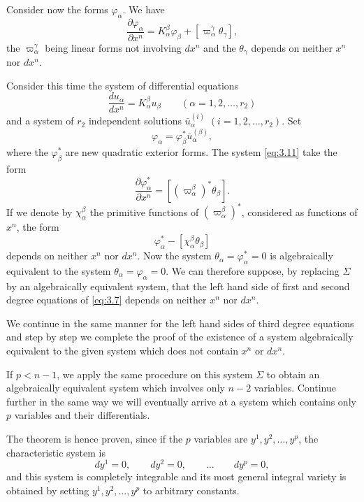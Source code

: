 \documentclass[leqno,11pt]{book}
\numberwithin{equation}{chapter}
\newcommand{\pd}{\partial}
\theoremstyle{shape1}
\theoremstyle{shape0}
\theoremstyle{shape2}
\theoremstyle{definition}
\begin{document}
Consider now the forms $\varphi_{\alpha}$. We have
\begin{equation}
  \label{eq:3.11}
  \frac{\pd \varphi_{\alpha}}{\pd x^{n}}=K^{\beta}_{\alpha}\varphi_{\beta}+[\varpi_{\alpha}^{\gamma}\theta_{\gamma}],
\end{equation}
the $\varpi_{\alpha}^{\gamma}$ being linear forms not involving $dx^{n}$ and the $\theta_{\gamma}$ depends on neither $x^{n}$ nor $dx^{n}$.

Consider this time the system of differential equations
\begin{equation}
  \label{eq:3.12}
  \frac{du_{\alpha}}{dx^{n}}=K_{\alpha}^{\beta}u_{\beta}\qquad(\alpha=1,2,\dots,r_{2})
\end{equation}
and a system of $r_{2}$ independent solutions $\bar u_{\alpha}^{(i)}$ $(i=1,2,\dots,r_{2})$. Set
\[
\varphi_{\alpha}=\varphi_{\beta}^{*}\bar u_{\alpha}^{(\beta)},
\]
where the $\varphi^{*}_{\beta}$ are new quadratic exterior forms. The system \eqref{eq:3.11} take the form
\[
\frac{\pd \varphi_{\alpha}^{*}}{\pd x^{n}}=[(\varpi_{\alpha}^{\beta})^{*}\theta_{\beta}].
\]
If we denote by $\chi_{\alpha}^{\beta}$ the primitive functions of $(\varpi_{\alpha}^{\beta})^{*}$, considered as functions of $x^{n}$,  the form
\[
\varphi_{\alpha}^{*}-[\chi_{\alpha}^{\beta}\theta_{\beta}]
\]
depends on neither $x^{n}$ nor $dx^{n}$. Now the system $\theta_{\alpha}=\varphi_{\alpha}^{*}=0$ is algebraically equivalent to the system $\theta_{\alpha}=\varphi_{\alpha}=0$. We can therefore suppose, by replacing $\Sigma$ by an algebraically equivalent system, that the left hand side of first and second degree equations of \eqref{eq:3.7} depends on neither $x^{n}$ nor $dx^{n}$.

We continue in the same manner for the left hand sides of  third degree equations and step by step we complete the proof of the existence of a system algebraically equivalent to the given system which does not contain $x^{n}$ or $dx^{n}$.

If $p<n-1$, we apply the same procedure on this system $\Sigma$ to obtain an algebraically equivalent system which involves only $n-2$ variables. Continue further in the same way we will eventually arrive at a system which contains only $p$ variables and their differentials.

The theorem is hence proven, since if the $p$ variables are $y^{1},y^{2},\dots,y^{p}$, the characteristic system is
\[
dy^{1}=0,\qquad dy^{2}=0,\qquad \dots\qquad dy^{p}=0,
\]
and this system is completely integrable and its most general integral variety is obtained by setting $y^{1},y^{2},\dots,y^{p}$ to arbitrary constants.
\end{document}
